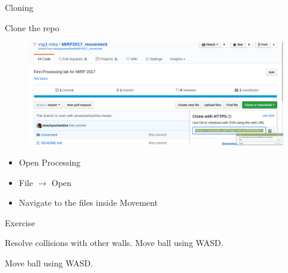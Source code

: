 \begin{frame}[fragile]{Cloning}{}
    \begin{block}{Clone the repo}
        \begin{figure}
            \begin{center}
                \includegraphics[width=0.8\linewidth]{images/git_clone.png}
            \end{center}
        \end{figure}
    \end{block}
    \begin{itemize}
        \item Open Processing
        \item File $\rightarrow$ Open
        \item Navigate to the files inside Movement 
    \end{itemize}
\end{frame}

\begin{frame}[fragile]{Exercise}{}
    \LARGE
    \begin{block}{}
    Resolve collisions with other walls.
    Move ball using WASD.
    \end{block}
    \begin{block}{}
    Move ball using WASD.
    \end{block}
\end{frame}
